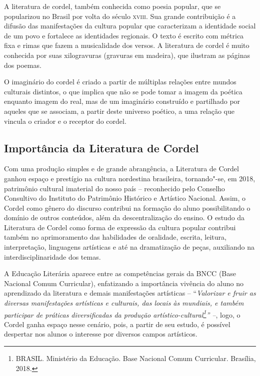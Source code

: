 \documentclass[12pt]{extarticle}
\begin{document}
A literatura de cordel, também conhecida como poesia popular, que se
popularizou no Brasil por volta do século \textsc{xviii}. Sua grande contribuição
é a difusão das manifestações da cultura popular que caracterizam a identidade
social de um povo e fortalece as identidades regionais. O texto é escrito com
métrica fixa e rimas que fazem a musicalidade dos versos. A literatura de
cordel é muito conhecida por suas xilogravuras (gravuras em madeira), que
ilustram as páginas dos poemas.

O imaginário do cordel é criado a partir de múltiplas relações entre mundos
culturais distintos, o que implica que não se pode tomar a imagem da poética
enquanto imagem do real, mas de um imaginário construído e partilhado por
aqueles que se associam, a partir deste universo poético, a uma relação que
vincula o criador e o receptor do cordel.

\subsection{Importância da Literatura de Cordel}

Com uma produção simples e de grande abrangência, a Literatura de Cordel ganhou
espaço e prestígio na cultura nordestina brasileira, tornando"-se, em 2018,
patrimônio cultural imaterial do nosso país -- reconhecido pelo Conselho
Consultivo do Instituto do Patrimônio Histórico e Artístico Nacional. Assim,
o Cordel como gênero do discurso contribui na formação do aluno possibilitando
o domínio de outros conteúdos, além da descentralização do ensino. O estudo da
Literatura de Cordel como forma de expressão da cultura popular contribui
também no aprimoramento das habilidades de oralidade, escrita, leitura,
interpretação, linguagens artísticas e até na dramatização de peças, auxiliando
na interdisciplinaridade dos temas.

A Educação Literária aparece entre as competências gerais da BNCC (Base
Nacional Comum Curricular), enfatizando a importância vivência do aluno no
aprendizado da literatura e demais manifestações artísticas --
``\emph{Valorizar e fruir as diversas manifestações artísticas e culturais, das
  locais às mundiais, e também participar de práticas diversificadas da
  produção artístico-cultural\footnote{BRASIL. Ministério da Educação. Base
    Nacional Comum Curricular.  Brasília, 2018.}'' --}, logo, o Cordel ganha
    espaço nesse cenário, pois, a partir de seu estudo, é possível despertar
    nos alunos o interesse por diversos campos artísticos.
\end{document}
